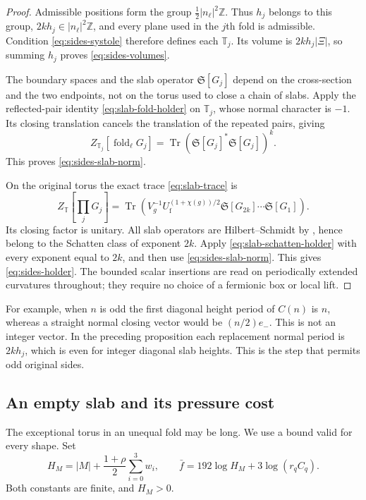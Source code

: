 \documentclass[11pt,letterpaper,reqno]{amsart}
\newcommand{\Z}{\mathbb Z}
\begin{document}
\begin{proof}
Admissible positions form the group
$\frac12|n_\ell|^2\Z$. Thus $h_j$ belongs to this group,
$2kh_j\in|n_\ell|^2\Z$, and every plane used in the $j$th fold
is admissible. Condition \eqref{eq:sides-systole} therefore defines
each $\mathbb T_j$. Its volume is $2kh_j|\Xi|$, so summing
$h_j$ proves \eqref{eq:sides-volumes}.

The boundary spaces and the slab operator $\mathfrak S[G_j]$ depend
on the cross-section and the two endpoints, not on the torus used
to close a chain of slabs. Apply the reflected-pair identity
\eqref{eq:slab-fold-holder} on $\mathbb T_j$, whose normal character
is $-1$. Its closing translation cancels the translation of the
repeated pairs, giving
\[
 Z_{\mathbb T_j}[\operatorname{fold}_\ell G_j]
   =\operatorname{Tr}
       (\mathfrak S[G_j]^*\mathfrak S[G_j])^k.
\]
This proves \eqref{eq:sides-slab-norm}.

On the original torus the exact trace \eqref{eq:slab-trace} is
\[
 Z_{\mathbb T}\left[\prod_jG_j\right]
  =\operatorname{Tr}\left(
     V_g^{-1}U_{\mathrm f}^{(1+\chi(g))/2}
     \mathfrak S[G_{2k}]\cdots\mathfrak S[G_1]\right).
\]
Its closing factor is unitary. All slab operators are
Hilbert--Schmidt by , hence belong
to the Schatten class of exponent $2k$. Apply
\eqref{eq:slab-schatten-holder} with every exponent equal to $2k$,
and then use \eqref{eq:sides-slab-norm}. This gives
\eqref{eq:sides-holder}. The bounded scalar insertions are read on
periodically extended curvatures throughout; they require no choice
of a fermionic box or local lift.
\end{proof}

For example, when $n$ is odd the first diagonal height period of
$C(n)$ is $n$, whereas a straight normal closing vector would be
$(n/2)e_-$. This is not an integer vector. In the preceding proposition
each replacement normal period is $2kh_j$, which is even for integer
diagonal slab heights. This is the step that permits odd original sides.

\subsection{An empty slab and its pressure cost}\label{sec:empty-slab}

The exceptional torus in an unequal fold may be long. We use a bound
valid for every shape. Set
\begin{equation}\label{eq:sides-constants}
 H_M=|M|+\frac{1+\rho}{2}\sum_{i=0}^3w_i,
 \qquad \bar f=192\log H_M+3\log(r_qC_q).
\end{equation}
Both constants are finite, and $H_M>0$.
\end{document}
